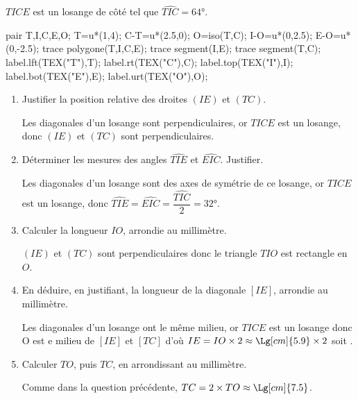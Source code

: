     $TICE$ est un losange de côté  tel que $\widehat{TIC}=\ang{64}$.

    \begin{Geometrie}
        pair T,I,C,E,O;
        T=u*(1,4);
        C-T=u*(2.5,0);
        O=iso(T,C);
        I-O=u*(0,2.5);
        E-O=u*(0,-2.5);
        trace polygone(T,I,C,E);
        trace segment(I,E);
        trace segment(T,C);
        label.lft(TEX("T"),T);
        label.rt(TEX("C"),C);
        label.top(TEX("I"),I);
        label.bot(TEX("E"),E);
        label.urt(TEX("O"),O);
    \end{Geometrie}
    \begin{enumerate}
        \item Justifier la position relative des droites $(IE)$ et $(TC)$.

        {\color{red}Les diagonales d'un losange sont perpendiculaires, or $TICE$ est un losange, donc $(IE)$ et $(TC)$ sont perpendiculaires.}
        \item Déterminer les mesures des angles $\widehat{TIE}$ et $\widehat{EIC}$. Justifier.

        {\color{red}Les diagonales d'un losange sont des axes de symétrie de ce losange, or $TICE$ est un losange, donc $\widehat{TIE}=\widehat{EIC}=\dfrac{\widehat{TIC}}{2}=\ang{32}$.}
        \item Calculer la longueur $IO$, arrondie au millimètre.

        {\color{red}$(IE)$ et $(TC)$ sont perpendiculaires donc le triangle $TIO$ est rectangle en $O$.

        }
        \item En déduire, en justifiant, la longueur de la diagonale $[IE]$, arrondie au millimètre.

        {\color{red}Les diagonales d'un losange ont le même milieu, or $TICE$ est un losange donc O est e milieu de $[IE]$ et $[TC]$ d'où $IE=IO\times 2\approx\Lg[cm]{5.9}\times 2$ soit .}
        \item Calculer $TO$, puis $TC$, en arrondissant au millimètre.

        {\color{red}

        Comme dans la question précédente, $TC=2\times TO\approx\Lg[cm]{7.5}$.
        }
    \end{enumerate}
